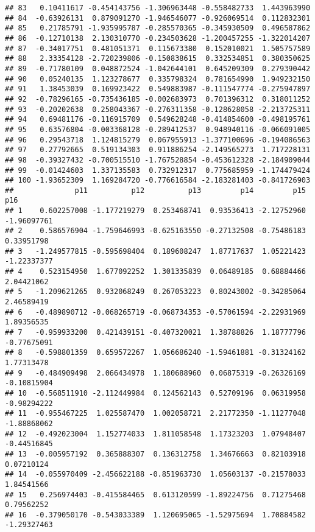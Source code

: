 \documentclass[
]{article}
\begin{document}
\begin{verbatim}
## 83   0.10411617 -0.454143756 -1.306963448 -0.558482733  1.443963990
## 84  -0.63926131  0.879091270 -1.946546077 -0.926069514  0.112832301
## 85   0.21785791 -1.935995787 -0.285570365 -0.345930509  0.496587862
## 86  -0.12710138  2.130310770 -0.234503628 -1.200457255 -1.322014207
## 87  -0.34017751  0.481051371  0.115673380  0.152010021  1.505757589
## 88   2.33354128 -2.720239806 -0.150838615  0.332534851  0.380350625
## 89  -0.71780109  0.048872524 -1.042644101  0.645209309  0.279390442
## 90   0.05240135  1.123278677  0.335798324  0.781654990  1.949232150
## 91   1.38453039  0.169923422  0.549883987 -0.111547774 -0.275947897
## 92  -0.78296165 -0.735436185 -0.002683973  0.701396312  0.318011252
## 93  -0.20202638  0.258043367 -0.276311358 -0.128628058 -2.213725311
## 94   0.69481176 -0.116915709  0.549628248 -0.414854600 -0.498195761
## 95   0.63576804 -0.003368128 -0.289412537  0.948940116 -0.066091005
## 96   0.29543718  1.124815279  0.067955913 -1.377100696 -0.194086563
## 97   0.27792665  0.519134303  0.911886254 -2.149565273  1.717228131
## 98  -0.39327432 -0.700515510 -1.767528854 -0.453612328 -2.184909044
## 99  -0.01424603  1.337135583  0.732912317  0.775685959 -1.174479424
## 100 -1.93652309  1.169284720 -0.776616584 -2.183281403 -0.841726903
##              p11          p12          p13         p14         p15         p16
## 1    0.602257008 -1.177219279  0.253468741  0.93536413 -2.12752960 -1.96097761
## 2    0.586576904 -1.759646993 -0.625163550 -0.27132508 -0.75486183  0.33951798
## 3   -1.249577815 -0.595698404  0.189608247  1.87717637  1.05221423 -1.22337377
## 4    0.523154950  1.677092252  1.301335839  0.06489185  0.68884466  2.04421062
## 5   -1.209621265  0.932068249  0.267053223  0.80243002 -0.34285064  2.46589419
## 6   -0.489890712 -0.068265719 -0.068734353 -0.57061594 -2.22931969  1.89356535
## 7   -0.959933200  0.421439151 -0.407320021  1.38788826  1.18777796 -0.77675091
## 8   -0.598801359  0.659572267  1.056686240 -1.59461881 -0.31324162  1.77313478
## 9   -0.484909498  2.066434978  1.180688960  0.06875319 -0.26326169 -0.10815904
## 10  -0.568511910 -2.112449984  0.124562143  0.52709196  0.06319958 -0.98294222
## 11  -0.955467225  1.025587470  1.002058721  2.21772350 -1.11277048 -1.88868062
## 12  -0.492023004  1.152774033  1.811058548  1.17323203  1.07948407 -0.44516845
## 13  -0.005957192  0.365888307  0.136312758  1.34676663  0.82103918  0.07210124
## 14  -0.055970409 -2.456622188 -0.851963730  1.05603137 -0.21578033  1.84541566
## 15   0.256974403 -0.415584465  0.613120599 -1.89224756  0.71275468  0.79562252
## 16  -0.379050170 -0.543033389  1.120695065 -1.52975694  1.70884582 -1.29327463

\end{verbatim}
\end{document}
